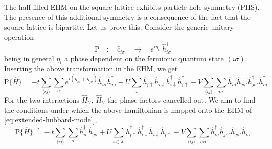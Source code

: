 The half-filled EHM on the square lattice exhibits particle-hole symmetry (PHS). The presence of this additional symmetry is a consequence of the fact that the square lattice is bipartite. Let us prove this. Consider the generic unitary operation
\begin{equation}\label{eq:phs-P-general}
	\mathrm{P}
	\quad\colon\quad
	\hat c_{i\sigma}
	\quad\to\quad
	e^{i\eta_{i\sigma}} \hat h_{i\sigma}^\dagger
\end{equation}
being in general $\eta_i$ a phase dependent on the fermionic quantum state $(i\sigma)$. Inserting the above transformation in the EHM, we get
\[
	\mathrm{P} \lbrace \hat H \rbrace =
	-t \sum_{\langle ij \rangle} \sum_\sigma e^{i(\eta_{i\sigma} + \eta_{j\sigma})} \hat h_{i\sigma} \hat h_{j\sigma}^\dagger
	+U \sum_i \hat h_{i\uparrow} \hat h_{i\downarrow} \hat h_{i\downarrow}^\dagger \hat h_{i\uparrow}^\dagger
	- V \sum_{\langle ij \rangle} \sum_{\sigma \sigma'} \hat h_{i\sigma} \hat h_{j\sigma'} \hat h_{j\sigma'}^\dagger \hat h_{i\sigma}^\dagger
\]
For the two interactions $\hat H_U$, $\hat H_V$ the phase factors cancelled out. We aim to find the conditions under which the above hamiltonian is mapped onto the EHM of \eqref{eq:extended-hubbard-model},
\[
	\mathrm{P} \lbrace \hat H \rbrace \stackrel{?}{=}
	-t \sum_{\langle ij \rangle} \sum_\sigma \hat h_{i\sigma}^\dagger \hat h_{j\sigma}
	+U \sum_{i\in\mathcal{L}} \hat h_{i\uparrow}^\dagger \hat h_{i\downarrow}^\dagger \hat h_{i\downarrow} \hat h_{i\uparrow}
	- V \sum_{\langle ij \rangle} \sum_{\sigma \sigma'} \hat h_{i\sigma}^\dagger \hat h_{j\sigma'} \hat h_{j\sigma'} \hat h_{i\sigma}
\]

